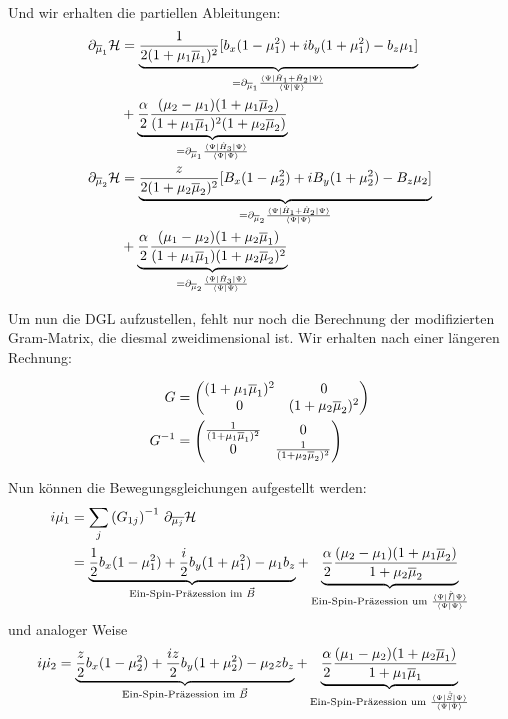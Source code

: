 Und wir erhalten die partiellen Ableitungen:
\begin{align}
    \partial_{\overline{\mu}_1}\mathcal{H} &= \underbrace{\frac{1}{2(1+\mu_1\overline{\mu}_1)^2}[b_x(1-\mu_1^2) + ib_y(1+\mu_1^2) - b_z\mu_1]}_{= \partial_{\overline{\mu}_1} \frac{\bra{\Psi}\hat{H}_1 + \hat{H}_2\ket{\Psi}}{\bra{\Psi}\ket{\Psi}}} \\
    &+ \underbrace{\frac{\alpha}{2}\frac{(\mu_2 -\mu_1)(1+\mu_1\overline{\mu}_2)}{(1+\mu_1\overline{\mu}_1)^2(1+\mu_2\overline{\mu}_2)}}_{= \partial_{\overline{\mu}_1} \frac{\bra{\Psi}\hat{H}_3\ket{\Psi}}{\bra{\Psi}\ket{\Psi}}}\\
    \partial_{\overline{\mu}_2}\mathcal{H} &= \underbrace{\frac{z}{2(1+\mu_2\overline{\mu}_2)^2}[B_x(1-\mu_2^2) + iB_y(1+\mu_2^2) - B_z\mu_2]}_{= \partial_{\overline{\mu}_2} \frac{\bra{\Psi}\hat{H}_1 + \hat{H}_2\ket{\Psi}}{\bra{\Psi}\ket{\Psi}}} \\
    &+ \underbrace{\frac{\alpha}{2}\frac{(\mu_1 -\mu_2)(1+\mu_2\overline{\mu}_1)}{(1+\mu_1\overline{\mu}_1)(1+\mu_2\overline{\mu}_2)^2}}_{= \partial_{\overline{\mu}_2} \frac{\bra{\Psi}\hat{H}_3\ket{\Psi}}{\bra{\Psi}\ket{\Psi}}}
\end{align}

Um nun die DGL aufzustellen, fehlt nur noch die Berechnung der modifizierten Gram-Matrix, die diesmal zweidimensional ist. 
Wir erhalten nach einer längeren Rechnung:

\begin{align}
    G &=
    \begin{pmatrix}
        (1+\mu_1\overline{\mu}_1)^2 & 0 \\
        0 &(1+\mu_2\overline{\mu}_2)^2
    \end{pmatrix} \\
    G^{-1} &=
    \begin{pmatrix}
        \frac{1}{(1+\mu_1\overline{\mu}_1)^2} & 0 \\
        0 &\frac{1}{(1+\mu_2\overline{\mu}_2)^2}
    \end{pmatrix}
\end{align}

\noindent Nun können die Bewegungsgleichungen aufgestellt werden:
\begin{align}
    i\dot{\mu_1} &= \sum_{j}\left(G_{1j}\right)^{-1}\thinspace \partial_{\overline{\mu_j}}\mathcal{H}  \\
    &=\underbrace{\frac{1}{2}b_x(1-\mu_1^2) + \frac{i}{2}b_y(1+\mu_1^2) -\mu_1 b_z}_{\text{Ein-Spin-Präzession im } \vec{B}} +\underbrace{\frac{\alpha}{2} \frac{(\mu_2-\mu_1)(1+\mu_1\overline{\mu}_2)}{1+\mu_2\overline{\mu}_2}}_{\text{Ein-Spin-Präzession um } \frac{\bra{\Psi}\hat{\vec{I}}\ket{\Psi}}{\bra{\Psi}\ket{\Psi}}  }    
\end{align}
und analoger Weise 
\begin{align}
    i\dot{\mu_2} &= \underbrace{\frac{z}{2}b_x(1-\mu_2^2) + \frac{iz}{2}b_y(1+\mu_2^2) -\mu_2 z b_z}_{\text{Ein-Spin-Präzession im } \vec{B}} +\underbrace{\frac{\alpha}{2} \frac{(\mu_1-\mu_2)(1+\mu_2\overline{\mu}_1)}{1+\mu_1\overline{\mu}_1}}_{\text{Ein-Spin-Präzession um } \frac{\bra{\Psi}\hat{\vec{S}}\ket{\Psi}}{\bra{\Psi}\ket{\Psi}}  }
\end{align}

